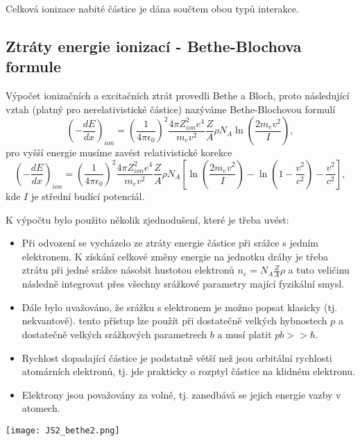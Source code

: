 \documentclass[../../main.tex]{subfiles}
\begin{document}
Celková ionizace nabité částice je dána součtem obou typů interakce.

\subsection{Ztráty energie ionizací - Bethe-Blochova formule}

Výpočet ionizačních a excitačních ztrát provedli Bethe a Bloch, proto následující  vztah (platný pro  nerelativistické částice) nazýváme Bethe-Blochovou formulí
\begin{equation}
\left(- \dfrac{dE}{dx} \right)_{ion} = \left( \dfrac{1}{4 \pi \epsilon_0}\right)^2 \dfrac{4\pi  Z_{ion}^2 e^4}{m_e v^2}  \dfrac{Z}{A} \rho N_A \ln \left( \dfrac{2m_e v^2}{I}\right) ,
\end{equation}
pro vyšší energie musíme zavést relativistické korekce 
\begin{equation}
\left(- \dfrac{dE}{dx} \right)_{ion} = \left( \dfrac{1}{4 \pi \epsilon_0}\right)^2 \dfrac{4\pi  Z_{ion}^2 e^4}{m_e v^2}  \dfrac{Z}{A} \rho N_A \left[ \ln \left( \dfrac{2m_e v^2}{I}\right) - \ln \left( 1 - \dfrac{v^2}{c^2}\right) - \dfrac{v^2}{c^2}\right] ,
\end{equation}
kde $I$ je střední budící potenciál.

K výpočtu bylo použito několik zjednodušení, které je třeba uvést:
\begin{itemize}
	\item Při odvození se vycházelo ze ztráty energie částice při srážce s jedním elektronem. K získání celkové změny energie na jednotku dráhy je třeba ztrátu při jedné srážce násobit hustotou elektronů $n_e = N_A \frac{Z}{A} \rho$ a tuto veličinu následně integrovat přes všechny srážkové parametry mající fyzikální smysl.
	\item Dále bylo uvažováno, že srážku s elektronem je možno popsat klasicky (tj. nekvantově). tento přístup lze použít při dostatečně velkých hybnostech $p$ a dostatečně velkých srážkových parametrech $b$ a musí platit $pb>>\hbar$.
	\item Rychlost dopadající částice je podstatně větší než jsou orbitální rychlosti atomárních elektronů, tj. jde prakticky o rozptyl částice na klidném elektronu.
	\item Elektrony jsou považovány za volné, tj. zanedbává se jejich energie vazby v atomech.
\end{itemize}

\begin{center}
	\texttt{[image: JS2\_bethe2.png]}
\end{center}
\end{document}

